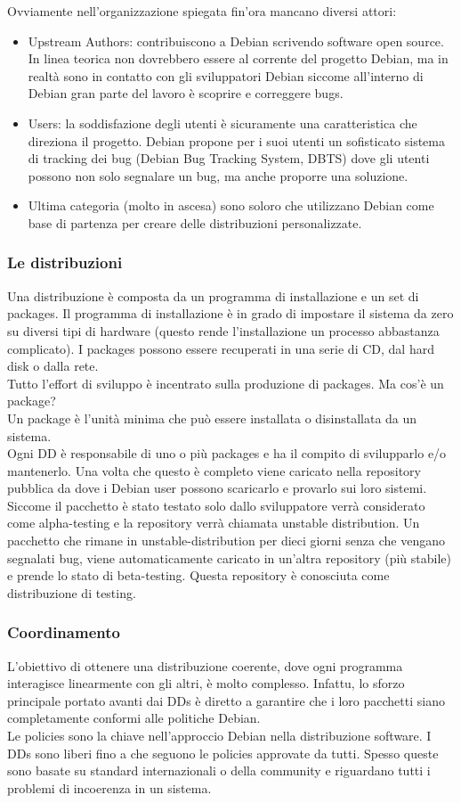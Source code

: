 Ovviamente nell'organizzazione spiegata fin'ora mancano diversi attori:
\begin{itemize}
    \item Upstream Authors: contribuiscono a Debian scrivendo software open source. In linea teorica non dovrebbero essere al corrente del progetto Debian, ma in realtà sono in contatto con gli sviluppatori Debian siccome all'interno di Debian gran parte del lavoro è scoprire e correggere bugs.
    \item Users: la soddisfazione degli utenti è sicuramente una caratteristica che direziona il progetto. Debian propone per i suoi utenti un sofisticato sistema di tracking dei bug (Debian Bug Tracking System, DBTS) dove gli utenti possono non solo segnalare un bug, ma anche proporre una soluzione.
    \item Ultima categoria (molto in ascesa) sono soloro che utilizzano Debian come base di partenza per creare delle distribuzioni personalizzate.
\end{itemize}
\subsubsection{Le distribuzioni}
Una distribuzione è composta da un programma di installazione e un set di packages. Il programma di installazione è in grado di impostare il sistema da zero su diversi tipi di hardware (questo rende l'installazione un processo abbastanza complicato). I packages possono essere recuperati in una serie di CD, dal hard disk o dalla rete.\\
Tutto l'effort di sviluppo è incentrato sulla produzione di packages. Ma cos'è un package?\\
Un package è l'unità minima che può essere installata o disinstallata da un sistema. \\
Ogni DD è responsabile di uno o più packages e ha il compito di svilupparlo e/o mantenerlo. Una volta che questo è completo viene caricato nella repository pubblica da dove i Debian user possono scaricarlo e provarlo sui loro sistemi. Siccome il pacchetto è stato testato solo dallo sviluppatore verrà considerato come alpha-testing e la repository verrà chiamata unstable distribution. Un pacchetto che rimane in unstable-distribution per dieci giorni senza che vengano segnalati bug, viene automaticamente caricato in un'altra repository (più stabile) e prende lo stato di beta-testing. Questa repository è conosciuta come distribuzione di testing. 
\subsubsection{Coordinamento}
L'obiettivo di ottenere una distribuzione coerente, dove ogni programma interagisce linearmente con gli altri, è molto complesso.
Infattu, lo sforzo principale portato avanti dai DDs è diretto a garantire che i loro pacchetti siano completamente conformi alle politiche Debian. \\
Le policies sono la chiave nell'approccio Debian nella distribuzione software. I DDs sono liberi fino a che seguono le policies approvate da tutti. Spesso queste sono basate su standard internazionali o della community e riguardano tutti i problemi di incoerenza in un sistema. 
